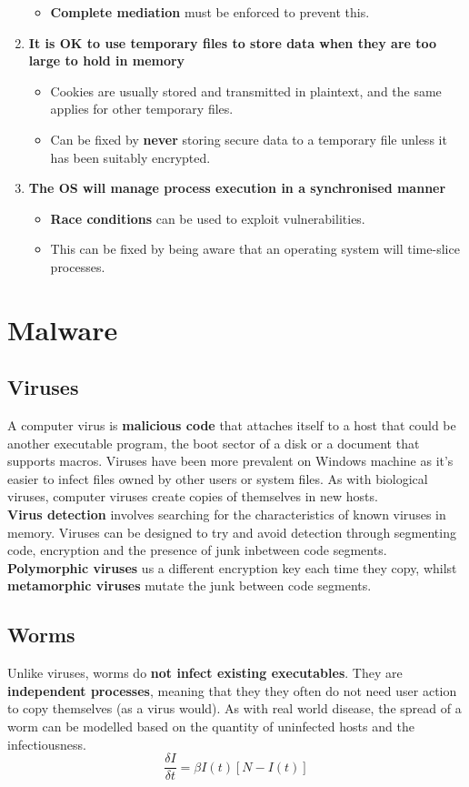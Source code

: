 \documentclass[final]{article}
\newcommand{\np}{\vspace{8pt} \\}
\begin{document}
\begin{enumerate}
\begin{itemize}
		\item \textbf{Complete mediation} must be enforced to prevent this.
	\end{itemize}
	\item \textbf{It is OK to use temporary files to store data when they are too large to hold in memory}
	\begin{itemize}
		\item Cookies are usually stored and transmitted in plaintext, and the same applies for other temporary files.
		\item Can be fixed by \textbf{never} storing secure data to a temporary file unless it has been suitably encrypted.
	\end{itemize}
	\item \textbf{The OS will manage process execution in a synchronised manner}
	\begin{itemize}
		\item \textbf{Race conditions} can be used to exploit vulnerabilities.
		\item This can be fixed by being aware that an operating system will time-slice processes.
	\end{itemize}
\end{enumerate}

\section{Malware}

\subsection{Viruses}
A computer virus is \textbf{malicious code} that attaches itself to a host that could be another executable program, the boot sector of a disk or a document that supports macros. Viruses have been more prevalent on Windows machine as it's easier to infect files owned by other users or system files. As with biological viruses, computer viruses create copies of themselves in new hosts. \np
\textbf{Virus detection} involves searching for the characteristics of known viruses in memory. Viruses can be designed to try and avoid detection through segmenting code, encryption and the presence of junk inbetween code segments. \textbf{Polymorphic viruses} us a different encryption key each time they copy, whilst \textbf{metamorphic viruses} mutate the junk between code segments.

\subsection{Worms}
Unlike viruses, worms do \textbf{not infect existing executables}. They are \textbf{independent processes}, meaning that they they often do not need user action to copy themselves (as a virus would). As with real world disease, the spread of a worm can be modelled based on the quantity of uninfected hosts and the infectiousness.
\[
	\frac{\delta I}{\delta t} = \beta I(t) [N - I(t)]
\]
\end{document}
